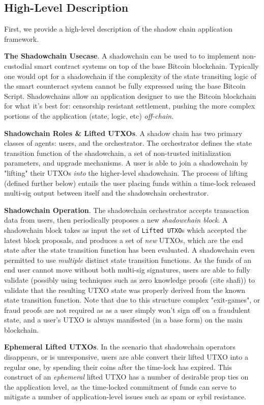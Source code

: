 \documentclass[12pt,a4paper]{article}
\theoremstyle{definition}
\begin{document}
\subsection{High-Level Description}

First, we provide a high-level description of the shadow chain application
framework.

\textbf{The Shadowchain Usecase}. A shadowchain can be used to to implement
non-custodial smart contract systems on top of the base Bitcoin blockchain.
Typically one would opt for a shadowchain if the complexity of the state
transiting logic of the smart counteract system cannot be fully expressed using
the base Bitcoin Script.  Shadowchains allow an application designer to use the
Bitcoin blockchain for what it's best for: censorship resistant settlement,
pushing the more complex portions of the application (state, logic, etc)
\emph{off-chain}.

\textbf{Shadowchain Roles \& Lifted UTXOs}. A shadow chain has two primary
classes of agents: users, and the orchestrator.  The orchestrator defines the
state transition function of the shadowchain, a set of non-trusted
initialization parameters, and upgrade mechanisms. A user is able to join a
shadowchain by "lifting" their UTXOs \emph{into} the higher-level shadowchain.
The process of lifting (defined further below) entails the user placing funds
within a time-lock released multi-sig output between itself and the shadowchain
orchestrator.

\textbf{Shadowchain Operation}. The shadowchain orchestrator accepts
transaction data from users, then periodically proposes a new \emph{shadowchain
block}. A shadowchain block takes as input the set of \texttt{Lifted UTXO}s
which accepted the latest block proposals, and produces a set of \emph{new}
UTXOs, which are the end state after the state transition function has been
evaluated. A shadowchain even permitted to use \emph{multiple} distinct state
transition functions. As the funds of an end user cannot move without both
multi-sig signatures, users are able to fully validate (possibly using
techniques such as zero knowledge proofs (cite shafi)) to validate that the
resulting UTXO state was properly derived from the known state transition
function.  Note that due to this structure complex "exit-games", or fraud
proofs are not required as as a user simply won't sign off on a fraudulent
state, and a user's UTXO is always manifested (in a base form) on the main
blockchain.

\textbf{Ephemeral Lifted UTXOs}. In the scenario that shadowchain operators
disappears, or is unresponsive, users are able convert their lifted UTXO into a
regular one, by spending their coins after the time-lock has expired. This
construct of an \emph{ephemeral} lifted UTXO has a number of desirable prop
ties on the application level, as the time-locked commitment of funds can serve
to mitigate a number of application-level issues such as spam or sybil
resistance.
\end{document}
